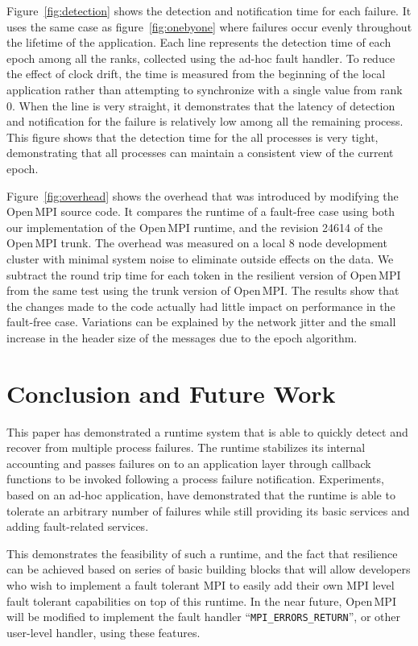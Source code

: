 \documentclass{llncs}
\newcommand{\ompi}{Open\,MPI\xspace}
\begin{document}
Figure~\ref{fig:detection} shows the detection and notification time
for each failure. It uses the same case as figure~\ref{fig:onebyone} where
failures occur evenly throughout the lifetime of the application. Each
line represents the detection time of each epoch among all the ranks,
collected using the ad-hoc fault handler. To reduce the effect of
clock drift, the time is measured from the beginning of the local
application rather than attempting to synchronize with a single value
from rank 0. When the line is very straight, it demonstrates that the
latency of detection and notification for the failure is relatively low
among all the remaining process. This figure shows that the detection
time for the all processes is very tight, demonstrating that all
processes can maintain a consistent view of the current epoch.

Figure~\ref{fig:overhead} shows the overhead that was introduced by
modifying the \ompi source code. It compares the runtime of a
fault-free case using both our implementation of the \ompi runtime,
and the revision 24614 of the \ompi trunk. The overhead was measured on a
local 8 node development cluster with minimal system noise to
eliminate outside effects on the data. We subtract the round trip time
for each token in the resilient version of \ompi from the same test
using the trunk version of \ompi. The results show that the changes
made to the code actually had little impact on performance in the
fault-free case. Variations can be explained by the network jitter
and the small increase in the header size of the messages due to the
epoch algorithm.

\section{Conclusion and Future Work}
\label{sect:conclusion}

This paper has demonstrated a runtime system that is able to quickly
detect and recover from multiple process failures. The runtime stabilizes its
internal accounting and passes failures on to an application layer
through callback functions to be invoked following a process failure
notification. Experiments, based on an ad-hoc application, have
demonstrated that the runtime is able to tolerate an arbitrary number
of failures while still providing its basic services and adding
fault-related services.

This demonstrates the feasibility of such a runtime, and the fact that
resilience can be achieved based on series of basic building blocks
that will allow developers who wish to implement a fault tolerant MPI
to easily add their own MPI level fault tolerant capabilities on top
of this runtime.  In the near future, \ompi will be modified to
implement the fault handler ``\texttt{MPI\_ERRORS\_RETURN}'', or other
user-level handler, using these features.
\end{document}
